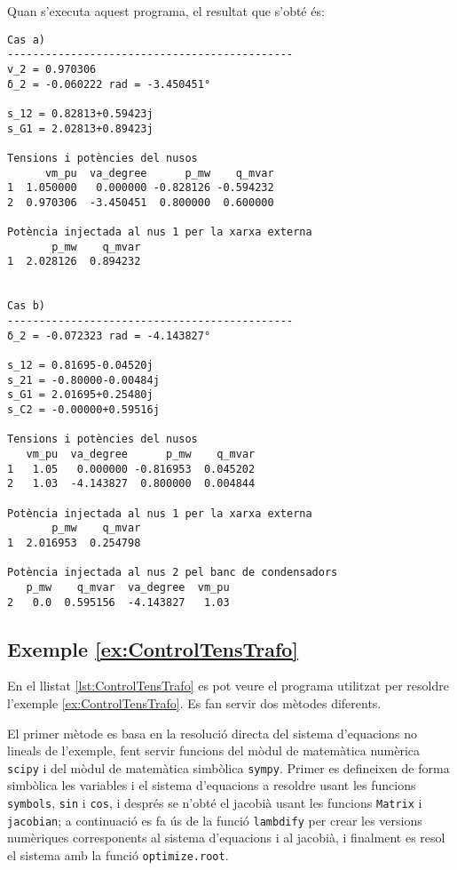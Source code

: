 Quan s'executa aquest programa, el resultat que s'obté és:
\lstset{
	language=,
	numbers=none,
	frame=none
}
\begin{lstlisting}
Cas a)
---------------------------------------------
v_2 = 0.970306
δ_2 = -0.060222 rad = -3.450451°

s_12 = 0.82813+0.59423j
s_G1 = 2.02813+0.89423j

Tensions i potències del nusos
      vm_pu  va_degree      p_mw    q_mvar
1  1.050000   0.000000 -0.828126 -0.594232
2  0.970306  -3.450451  0.800000  0.600000

Potència injectada al nus 1 per la xarxa externa
       p_mw    q_mvar
1  2.028126  0.894232


Cas b)
---------------------------------------------
δ_2 = -0.072323 rad = -4.143827°

s_12 = 0.81695-0.04520j
s_21 = -0.80000-0.00484j
s_G1 = 2.01695+0.25480j
s_C2 = -0.00000+0.59516j

Tensions i potències del nusos
   vm_pu  va_degree      p_mw    q_mvar
1   1.05   0.000000 -0.816953  0.045202
2   1.03  -4.143827  0.800000  0.004844

Potència injectada al nus 1 per la xarxa externa
       p_mw    q_mvar
1  2.016953  0.254798

Potència injectada al nus 2 pel banc de condensadors
   p_mw    q_mvar  va_degree  vm_pu
2   0.0  0.595156  -4.143827   1.03
\end{lstlisting} 


\hypertarget{exemple:ControlTensTrafo}{\subsection{Exemple \ref*{ex:ControlTensTrafo} \ControlTensTrafo}}
En el llistat \vref{lst:ControlTensTrafo} es pot veure el programa utilitzat per resoldre l'exemple \vref{ex:ControlTensTrafo}. Es fan servir dos mètodes diferents.

El primer mètode es basa en la resolució directa del sistema d'equacions no lineals de l'exemple, fent servir funcions  del mòdul de matemàtica numèrica \texttt{scipy} i del mòdul de matemàtica simbòlica \texttt{sympy}. Primer es defineixen de forma simbòlica les variables i el sistema d'equacions a resoldre usant les funcions \texttt{symbols}, \texttt{sin} i \texttt{cos}, i després se n'obté el jacobià usant les funcions \texttt{Matrix} i \texttt{jacobian}; a continuació es fa ús de la funció  \texttt{lambdify} per crear les versions numèriques corresponents al sistema d'equacions i al jacobià, i finalment es resol el sistema amb la funció \texttt{optimize.root}.

